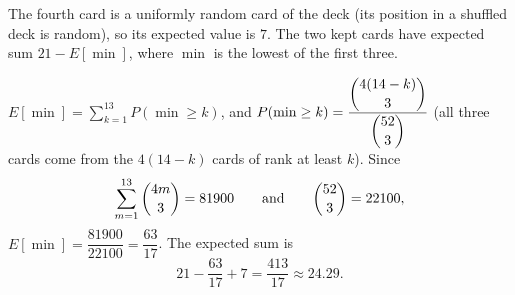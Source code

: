 The fourth card is a uniformly random card of the deck (its position in a shuffled deck is random), so its expected value is $7$. The two kept cards have expected sum $21-E[\min]$, where $\min$ is the lowest of the first three.

$E[\min]=\sum_{k=1}^{13}P(\min\ge k)$, and $P(\min\ge k)=\dfrac{\dbinom{4(14-k)}{3}}{\dbinom{52}{3}}$ (all three cards come from the $4(14-k)$ cards of rank at least $k$). Since
\[\sum_{m=1}^{13}\dbinom{4m}{3}=81900\qquad\text{and}\qquad\dbinom{52}{3}=22100,\]
$E[\min]=\dfrac{81900}{22100}=\dfrac{63}{17}$. The expected sum is
\[21-\dfrac{63}{17}+7=\boxed{\dfrac{413}{17}}\approx24.29.\]
